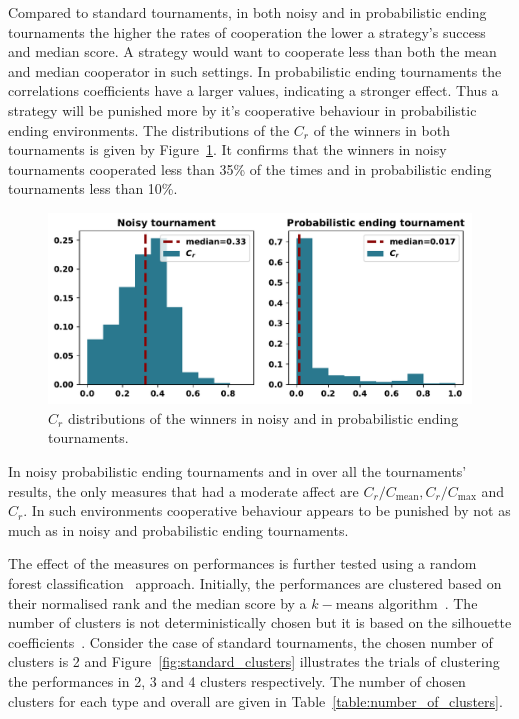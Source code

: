 \documentclass{article}
\begin{document}
Compared to standard tournaments, in both noisy and in probabilistic ending
tournaments the higher the rates of cooperation the lower a strategy's success
and median score. A strategy would want to cooperate less than both
the mean and median cooperator in such settings. In probabilistic ending
tournaments the correlations coefficients have a larger values, indicating a
stronger effect. Thus a strategy will be punished more by it's cooperative
behaviour in probabilistic ending environments. The distributions of the $C_r$ of the winners in
both tournaments is given by Figure~\ref{fig:c_r_distributions}. It confirms
that the winners in noisy tournaments cooperated less than 35\% of the times
and in probabilistic ending tournaments less than 10\%.

\begin{figure}[!htbp]
    \centering
    \includegraphics[width=.7\textwidth]{../images/c_r_winners_tournaments.pdf}
    \caption{$C_r$ distributions of the winners in noisy and in probabilistic
    ending tournaments.}\label{fig:c_r_distributions}
\end{figure}

In noisy probabilistic ending tournaments and in over all the tournaments' results,
the only measures that had a moderate affect are $C_r/C_{\text{mean}},
C_r/C_{\text{max}}$ and $C_r$. In such environments cooperative behaviour
appears to be punished by not as much as in noisy and probabilistic ending
tournaments.

The effect of the measures on performances is further tested using a random forest
classification~\cite{breiman2001} approach. Initially, the performances are
clustered based on their normalised rank and the median score by a \(k-\)means
algorithm~\cite{Arthur2007}. The number of clusters is not deterministically
chosen but it is based on the silhouette coefficients~\cite{Rousseeuw1987}.
Consider the case of standard tournaments, the chosen number of clusters is
2 and Figure~\ref{fig:standard_clusters} illustrates the trials of clustering the
performances in 2, 3 and 4 clusters respectively. The number of chosen clusters
for each type and overall are given in Table~\ref{table:number_of_clusters}.
\end{document}
